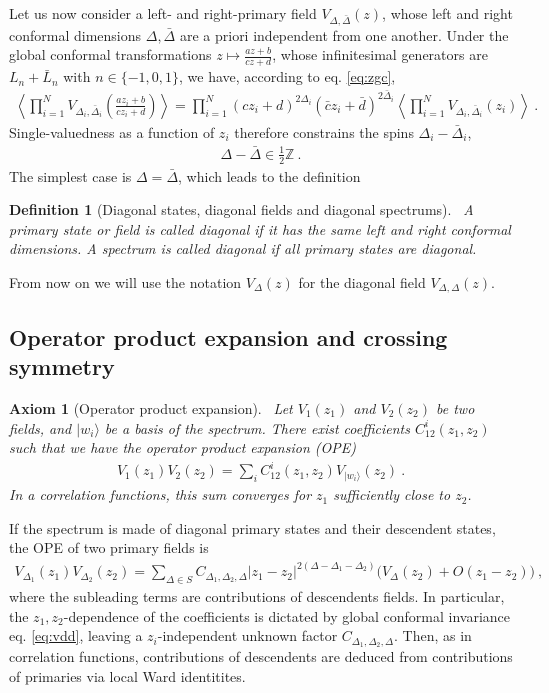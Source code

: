 \documentclass[12pt, a4paper]{article}
\theoremstyle{break}
\newtheorem{hyp}[exo]{Axiom}
\newtheorem{defn}[exo]{Definition}
\begin{document}
Let us now consider a left- and right-primary field $V_{\Delta,\bar\Delta}(z)$, whose left and right conformal dimensions $\Delta,\bar\Delta$ are a priori independent from one another. 
Under the global conformal transformations $z\mapsto \frac{az+b}{cz+d}$, whose infinitesimal generators are $L_n+\bar L_n$ with $n\in\{-1, 0, 1\}$, we have, according to eq. \eqref{eq:zgc},
\begin{align}
 \left< \prod_{i=1}^N  V_{\Delta_i,\bar \Delta_i}\left(\frac{az_i+b}{cz_i+d}\right) \right>
 = \prod_{i=1}^N (cz_i +d)^{2\Delta_i}(\bar cz_i +\bar d)^{2\bar \Delta_i} \left< \prod_{i=1}^N V_{\Delta_i,\bar \Delta_i}(z_i) \right>\ .
 \label{eq:vdd}
\end{align}
Single-valuedness as a function of $z_i$ therefore constrains the spins $\Delta_i-\bar \Delta_i$,
\begin{align}
 \Delta -\bar \Delta \in \frac12\mathbb{Z}\ .
\end{align} 
The simplest case is $\Delta=\bar\Delta$, which leads to the definition

\begin{defn}[Diagonal states, diagonal fields and diagonal spectrums]
 ~\label{def:diag}
 A primary state or field is called diagonal if it has the same left and right conformal dimensions. A spectrum is called diagonal if all primary states are diagonal.
\end{defn}
From now on we will use the notation $V_\Delta(z)$ for the diagonal field $V_{\Delta,\Delta}(z)$.

\subsection{Operator product expansion and crossing symmetry}

\begin{hyp}[Operator product expansion]
 ~\label{hyp:ope}
 Let $V_1(z_1)$ and $V_2(z_2)$ be two fields, and $|w_i\rangle$ be a basis of the spectrum.
 There exist coefficients $C^i_{12}(z_1,z_2)$ such that we have the operator product expansion (OPE) 
 \begin{align}
  V_1(z_1)V_2(z_2) = \sum_i C^i_{12}(z_1,z_2) V_{|w_i\rangle}(z_2)\ .
 \end{align}
 In a correlation functions,
 this sum converges for $z_1$ sufficiently close to $z_2$.
\end{hyp}
If the spectrum is made of diagonal primary states and their descendent states, the OPE of two primary fields is
\begin{align}
 V_{\Delta_1}(z_1) V_{\Delta_2}(z_2) 
 = \sum_{\Delta\in S} C_{\Delta_1,\Delta_2,\Delta} |z_1-z_2|^{2(\Delta-\Delta_1-\Delta_2)}
 \Big(V_{\Delta}(z_2) + O(z_1-z_2) \Big)\ ,
 \label{eq:ope}
\end{align}
where the subleading terms are contributions of descendents fields. 
In particular, the $z_1,z_2$-dependence of the coefficients is dictated by global conformal invariance eq. \eqref{eq:vdd}, leaving a $z_i$-independent unknown factor $C_{\Delta_1,\Delta_2,\Delta}$.
Then, as in correlation functions, contributions of descendents are deduced from contributions of primaries via local Ward identitites.
\end{document}
